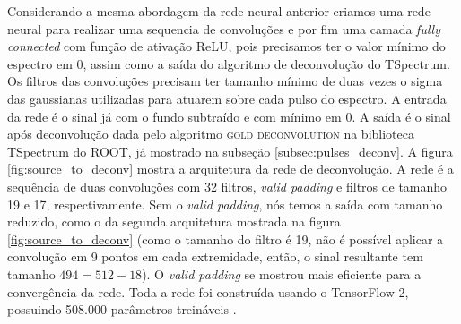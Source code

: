 \documentclass[a4paper,12pt,oneside]{book}
\begin{document}


\par Considerando a mesma abordagem da rede neural anterior criamos uma rede neural para realizar uma sequencia de convoluções e por fim uma camada \textit{fully connected} com função de ativação ReLU, pois precisamos ter o valor mínimo do espectro em 0, assim como a saída do algoritmo de deconvolução do TSpectrum. Os filtros das convoluções precisam ter tamanho mínimo de duas vezes o sigma das gaussianas utilizadas para atuarem sobre cada pulso do espectro. A entrada da rede é o sinal já com o fundo subtraído e com mínimo em 0. A saída é o sinal após deconvolução dada pelo algoritmo \textsc{gold deconvolution} na biblioteca TSpectrum do ROOT, já mostrado na subseção \ref{subsec:pulses_deconv}. A figura \ref{fig:source_to_deconv} mostra a arquitetura da rede de deconvolução. A rede é a sequência de duas convoluções com 32 filtros, \textit{valid padding} e filtros de tamanho 19 e 17, respectivamente. Sem o \textit{valid padding}, nós temos a saída com tamanho reduzido, como o da segunda arquitetura mostrada na figura \ref{fig:source_to_deconv} (como o tamanho do filtro é 19, não é possível aplicar a convolução em 9 pontos em cada extremidade, então, o sinal resultante tem tamanho $494=512-18$). O \textit{valid padding} se mostrou mais eficiente para a convergência da rede. Toda a rede foi construída usando o TensorFlow 2, possuindo 508.000 parâmetros treináveis \cite{FORTINO2022166497}.


\end{document}
